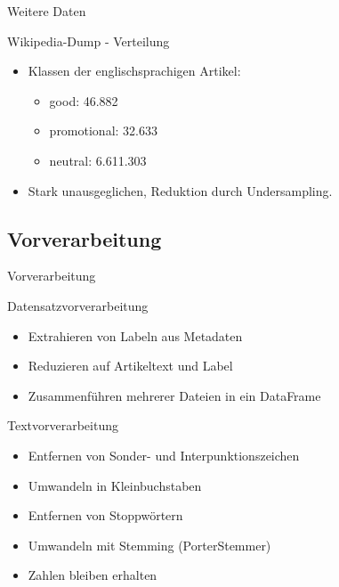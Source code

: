 \documentclass[aspectratio=169]{beamer} %
\begin{document}
\begin{frame}{Weitere Daten}
    \begin{block}{Wikipedia-Dump - Verteilung}      
        \begin{itemize}
            \item Klassen der englischsprachigen Artikel:
                  \begin{itemize}
                      \item good: 46.882
                      \item promotional: 32.633
                      \item neutral: 6.611.303
                  \end{itemize}
            \item Stark unausgeglichen, Reduktion durch Undersampling.
        \end{itemize}
    \end{block}
\end{frame}

\subsection{Vorverarbeitung}

\begin{frame}{Vorverarbeitung}
    \begin{block}{Datensatzvorverarbeitung}
        \begin{itemize}
            \item Extrahieren von Labeln aus Metadaten
            \item Reduzieren auf Artikeltext und Label
            \item Zusammenführen mehrerer Dateien in ein DataFrame
        \end{itemize}
    \end{block}
    \begin{block}{Textvorverarbeitung}
        \begin{itemize}
            \item Entfernen von Sonder- und Interpunktionszeichen
            \item Umwandeln in Kleinbuchstaben
            \item Entfernen von Stoppwörtern
            \item Umwandeln mit Stemming (PorterStemmer)
            \item Zahlen bleiben erhalten
        \end{itemize}
    \end{block}
\end{frame}
\end{document}
